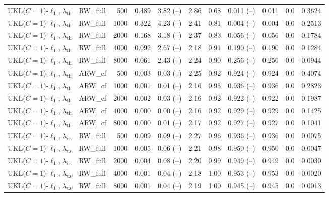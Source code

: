 \begin{tabular}{llrrrrrrrrr}
UKL($C=1$)-$\ell_1$, $\lambda_{\mathrm{th}}$ & RW\_full & 500 & 0.489 & 3.82 (--) & 2.86 & 0.68 & 0.011 (--) & 0.011 & 0.0 & 0.3624 \\
UKL($C=1$)-$\ell_1$, $\lambda_{\mathrm{th}}$ & RW\_full & 1000 & 0.322 & 4.23 (--) & 2.41 & 0.81 & 0.004 (--) & 0.004 & 0.0 & 0.2513 \\
UKL($C=1$)-$\ell_1$, $\lambda_{\mathrm{th}}$ & RW\_full & 2000 & 0.168 & 3.18 (--) & 2.37 & 0.83 & 0.056 (--) & 0.056 & 0.0 & 0.1784 \\
UKL($C=1$)-$\ell_1$, $\lambda_{\mathrm{th}}$ & RW\_full & 4000 & 0.092 & 2.67 (--) & 2.18 & 0.91 & 0.190 (--) & 0.190 & 0.0 & 0.1284 \\
UKL($C=1$)-$\ell_1$, $\lambda_{\mathrm{th}}$ & RW\_full & 8000 & 0.061 & 2.43 (--) & 2.24 & 0.90 & 0.256 (--) & 0.256 & 0.0 & 0.0944 \\
UKL($C=1$)-$\ell_1$, $\lambda_{\mathrm{th}}$ & ARW\_cf & 500 & 0.003 & 0.03 (--) & 2.25 & 0.92 & 0.924 (--) & 0.924 & 0.0 & 0.4074 \\
UKL($C=1$)-$\ell_1$, $\lambda_{\mathrm{th}}$ & ARW\_cf & 1000 & 0.001 & 0.01 (--) & 2.16 & 0.93 & 0.936 (--) & 0.936 & 0.0 & 0.2823 \\
UKL($C=1$)-$\ell_1$, $\lambda_{\mathrm{th}}$ & ARW\_cf & 2000 & 0.002 & 0.03 (--) & 2.16 & 0.92 & 0.922 (--) & 0.922 & 0.0 & 0.1987 \\
UKL($C=1$)-$\ell_1$, $\lambda_{\mathrm{th}}$ & ARW\_cf & 4000 & 0.000 & 0.00 (--) & 2.16 & 0.92 & 0.929 (--) & 0.929 & 0.0 & 0.1425 \\
UKL($C=1$)-$\ell_1$, $\lambda_{\mathrm{th}}$ & ARW\_cf & 8000 & 0.000 & 0.01 (--) & 2.17 & 0.92 & 0.927 (--) & 0.927 & 0.0 & 0.1041 \\
UKL($C=1$)-$\ell_1$, $\lambda_{\mathrm{us}}$ & RW\_full & 500 & 0.009 & 0.09 (--) & 2.27 & 0.96 & 0.936 (--) & 0.936 & 0.0 & 0.0075 \\
UKL($C=1$)-$\ell_1$, $\lambda_{\mathrm{us}}$ & RW\_full & 1000 & 0.005 & 0.06 (--) & 2.21 & 0.98 & 0.950 (--) & 0.950 & 0.0 & 0.0047 \\
UKL($C=1$)-$\ell_1$, $\lambda_{\mathrm{us}}$ & RW\_full & 2000 & 0.004 & 0.08 (--) & 2.20 & 0.99 & 0.949 (--) & 0.949 & 0.0 & 0.0030 \\
UKL($C=1$)-$\ell_1$, $\lambda_{\mathrm{us}}$ & RW\_full & 4000 & 0.001 & 0.04 (--) & 2.18 & 1.00 & 0.953 (--) & 0.953 & 0.0 & 0.0020 \\
UKL($C=1$)-$\ell_1$, $\lambda_{\mathrm{us}}$ & RW\_full & 8000 & 0.001 & 0.04 (--) & 2.19 & 1.00 & 0.945 (--) & 0.945 & 0.0 & 0.0013 \\

\end{tabular}
